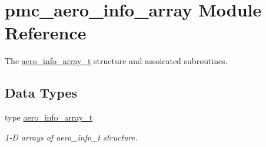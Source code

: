 \hypertarget{namespacepmc__aero__info__array}{}\section{pmc\+\_\+aero\+\_\+info\+\_\+array Module Reference}
\label{namespacepmc__aero__info__array}


The \mbox{\hyperlink{structpmc__aero__info__array_1_1aero__info__array__t}{aero\+\_\+info\+\_\+array\+\_\+t}} structure and assoicated subroutines.  


\subsection*{Data Types}
\begin{DoxyCompactItemize}
\item 
type \mbox{\hyperlink{structpmc__aero__info__array_1_1aero__info__array__t}{aero\+\_\+info\+\_\+array\+\_\+t}}
\begin{DoxyCompactList}\small\item\em 1-\/D arrays of aero\+\_\+info\+\_\+t structure. \end{DoxyCompactList}\end{DoxyCompactItemize}
